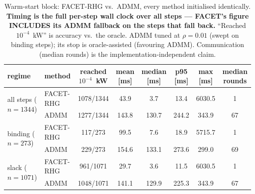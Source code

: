 \begin{table}[H]\centering\small
\begin{tabular}{llcccccc}
\toprule
regime & method & reached $10^{-4}$~kW & mean [ms] & median [ms] & p95 [ms] & max [ms] & median rounds\\
\midrule
\multirow{2}{*}{all steps ($n{=}1344$)} & FACET-RHG & 1078/1344 & 43.9 & 3.7 & 13.4 & 6030.5 & 1\\
 & ADMM & 1277/1344 & 143.8 & 130.7 & 244.2 & 343.9 & 67\\
\midrule
\multirow{2}{*}{binding ($n{=}273$)} & FACET-RHG & 117/273 & 99.5 & 7.6 & 18.9 & 5715.7 & 1\\
 & ADMM & 229/273 & 154.6 & 133.1 & 273.6 & 299.0 & 69\\
\midrule
\multirow{2}{*}{slack ($n{=}1071$)} & FACET-RHG & 961/1071 & 29.7 & 3.6 & 11.5 & 6030.5 & 1\\
 & ADMM & 1048/1071 & 141.1 & 129.9 & 225.3 & 343.9 & 67\\
\midrule
\bottomrule
\end{tabular}
\caption{Warm-start block: FACET-RHG vs.\ ADMM, every method initialised identically. \textbf{Timing is the full per-step wall clock over all steps --- FACET's figure INCLUDES its ADMM fallback on the steps that fall back.} ``Reached $10^{-4}$~kW'' is accuracy vs.\ the oracle. ADMM tuned at $\rho=0.01$ (swept on binding steps); its stop is oracle-assisted (favouring ADMM). Communication (median rounds) is the implementation-independent claim.}
\label{tab:bench-warm}
\end{table}
